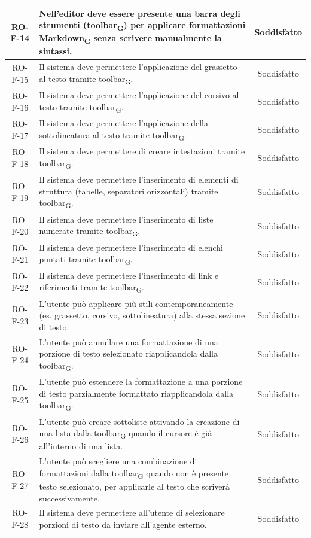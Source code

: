 \documentclass[11pt,a4paper]{article}
\newcommand{\gls}[1]{#1\textsubscript{G}}
\begin{document}
\begin{longtable}{|c|p{11cm}|c|}
RO-F-14 & Nell'editor deve essere presente una barra degli strumenti (\gls{toolbar}) per applicare formattazioni \gls{Markdown} senza scrivere manualmente la sintassi. & Soddisfatto \\
\hline
RO-F-15 & Il sistema deve permettere l'applicazione del grassetto al testo tramite \gls{toolbar}. & Soddisfatto \\
\hline
RO-F-16 & Il sistema deve permettere l'applicazione del corsivo al testo tramite \gls{toolbar}. & Soddisfatto \\
\hline
RO-F-17 & Il sistema deve permettere l'applicazione della sottolineatura al testo tramite \gls{toolbar}. & Soddisfatto \\
\hline
RO-F-18 & Il sistema deve permettere di creare intestazioni tramite \gls{toolbar}. & Soddisfatto \\
\hline
RO-F-19 & Il sistema deve permettere l'inserimento di elementi di struttura (tabelle, separatori orizzontali) tramite \gls{toolbar}. & Soddisfatto \\
\hline
RO-F-20 & Il sistema deve permettere l'inserimento di liste numerate tramite \gls{toolbar}. & Soddisfatto \\
\hline
RO-F-21 & Il sistema deve permettere l'inserimento di elenchi puntati tramite \gls{toolbar}. & Soddisfatto \\
\hline
RO-F-22 & Il sistema deve permettere l'inserimento di link e riferimenti tramite \gls{toolbar}. & Soddisfatto \\
\hline
RO-F-23 & L'utente può applicare più stili contemporaneamente (es. grassetto, corsivo, sottolineatura) alla stessa sezione di testo. & Soddisfatto \\
\hline
RO-F-24 & L'utente può annullare una formattazione di una porzione di testo selezionato riapplicandola dalla \gls{toolbar}. & Soddisfatto \\
\hline
RO-F-25 & L'utente può estendere la formattazione a una porzione di testo parzialmente formattato riapplicandola dalla \gls{toolbar}. & Soddisfatto \\
\hline
RO-F-26 & L'utente può creare sottoliste attivando la creazione di una lista dalla \gls{toolbar} quando il cursore è già all'interno di una lista. & Soddisfatto \\
\hline
RO-F-27 & L'utente può scegliere una combinazione di formattazioni dalla \gls{toolbar} quando non è presente testo selezionato, per applicarle al testo che scriverà successivamente. & Soddisfatto \\
\hline
RO-F-28 & Il sistema deve permettere all'utente di selezionare porzioni di testo da inviare all'agente esterno. & Soddisfatto \\

\end{longtable}
\end{document}
